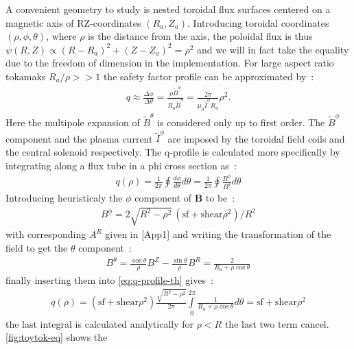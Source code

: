 A convenient geometry to study is nested toroidal flux surfaces centered on a magnetic axis of RZ-coordinates $(R_a, Z_a)$. Introducing toroidal coordinates $(\rho, \phi, \theta)$, where $\rho$ is the distance from the axis, the poloidal flux is thus $\psi(R, Z) \propto (R - R_a)^2 + (Z - Z_a)^2 = \rho^2$ and we will in fact take the equality due to the freedom of dimension in the implementation. For large aspect ratio tokamaks $R_a/\rho >> 1$ the safety factor profile can be approximated by~:
\begin{align*}
    q \approx \frac{\Delta\phi}{\Delta\theta} = \frac{\rho \tilde{B}^\phi}{R_a \tilde{B}^\theta} = \frac{2\pi}{\mu_0\tilde{I}^\phi R_a} \rho^2.
\end{align*}
Here the multipole expansion of $\tilde{B}^\theta$ is considered only up to first order. The $\tilde{B}^\phi$ component and the plasma current $\tilde{I}^\phi$ are imposed by the toroidal field coils and the central solenoid respectively. The q-profile is calculated more specifically by integrating along a flux tube in a phi cross section \cite[pp.111-112]{wesson_tokamaks_2011} as~:
\begin{align}\label{eq:q-profile-th}
    q(\rho) = \frac{1}{2\pi}\oint \frac{d\phi}{d\theta}d\theta = \frac{1}{2\pi}\oint \frac{B^\phi}{B^\theta}d\theta
\end{align}
Introducing heuristicaly the $\phi$ component of $\textbf{B}$ to be~:
\begin{align*}
    B^\phi = 2\sqrt{R^2-\rho^2}\,(\text{sf}+\text{shear}\rho^2)/R^2
\end{align*}
with corresponding $A^R$ given in [App1] and writing the transformation of the field to get the $\theta$ component~:
\begin{align*}
    B^\theta = \frac{\cos{\theta}}{\rho}B^Z - \frac{\sin{\theta}}{\rho}B^R = \frac{2}{R_a+\rho\cos{\theta}}
\end{align*}
finally inserting them into \eqref{eq:q-profile-th} gives~:
\begin{align*}
     q(\rho) = (\text{sf}+\text{shear}\rho^2)\frac{\sqrt{R^2-\rho^2}}{2\pi}\int\limits_{0}^{2\pi}\frac{1}{R_a + \rho\cos{\theta}}d\theta = \text{sf}+\text{shear}\rho^2
\end{align*}
the last integral is calculated analytically for $\rho < R$ the last two term cancel. \ref{fig:toytok-eq} shows the 

